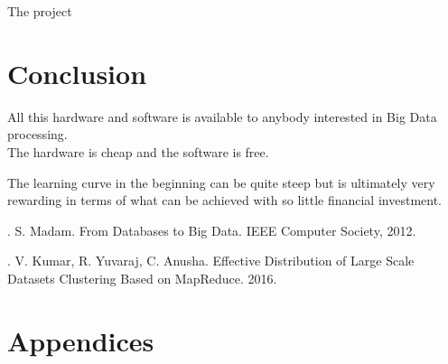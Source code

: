 \documentclass[12pt]{article} %
\begin{document}
	

	
	The project 
	
	
	\section{Conclusion} %
	
	All this hardware and software is available to anybody interested in Big Data processing.\\
	
	The hardware is cheap and the software is free.\
	
	The learning curve in the beginning can be quite steep but is ultimately very rewarding in terms of what can be achieved with so little financial investment.
	
	
	
	
	\newpage
	
	
	\begin{thebibliography}{99} %
		
		. S. Madam. From Databases to Big Data. IEEE Computer Society, 2012.
	
		
		. V. Kumar, R. Yuvaraj, C. Anusha. Effective Distribution of Large Scale Datasets Clustering Based on MapReduce. 2016.

		
	\end{thebibliography}
	
	\section{Appendices}
	
	
\end{document}
